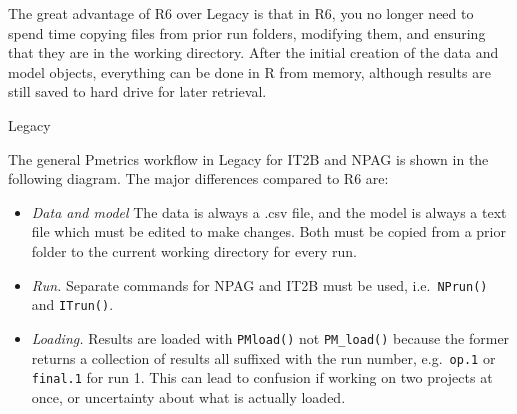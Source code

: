 \documentclass[
]{book}
\newenvironment{Shaded}{\begin{snugshade}}{\end{snugshade}}
\newcommand{\AttributeTok}[1]{\textcolor[rgb]{0.77,0.63,0.00}{#1}}
\newcommand{\CommentTok}[1]{\textcolor[rgb]{0.56,0.35,0.01}{\textit{#1}}}
\newcommand{\DecValTok}[1]{\textcolor[rgb]{0.00,0.00,0.81}{#1}}
\newcommand{\FloatTok}[1]{\textcolor[rgb]{0.00,0.00,0.81}{#1}}
\newcommand{\FunctionTok}[1]{\textcolor[rgb]{0.00,0.00,0.00}{#1}}
\newcommand{\NormalTok}[1]{#1}
\newcommand{\OtherTok}[1]{\textcolor[rgb]{0.56,0.35,0.01}{#1}}
\newcommand{\SpecialCharTok}[1]{\textcolor[rgb]{0.00,0.00,0.00}{#1}}
\newcommand{\StringTok}[1]{\textcolor[rgb]{0.31,0.60,0.02}{#1}}
\providecommand{\tightlist}{%
  \setlength{\itemsep}{0pt}\setlength{\parskip}{0pt}}
\begin{document}
\begin{Shaded}
\end{Shaded}

The great advantage of R6 over Legacy is that in R6, you no longer need to spend time copying files from prior run folders, modifying them, and ensuring that they are in the working directory. After the initial creation of the data and model objects, everything can be done in R from memory, although results are still saved to hard drive for later retrieval.

{Legacy}

The general Pmetrics workflow in Legacy for IT2B and NPAG is shown in the
following diagram. The major differences compared to R6 are:

\begin{itemize}
\tightlist
\item
  \emph{Data and model} The data is always a .csv file, and the model is always a text file which must be edited to make changes. Both must be copied from a prior folder to the current working directory for every run.
\item
  \emph{Run.} Separate commands for NPAG and IT2B must be used, i.e.~\texttt{NPrun()} and \texttt{ITrun()}.
\item
  \emph{Loading.} Results are loaded with \texttt{PMload()} not \texttt{PM\_load()} because the former returns a collection of results all suffixed with the run number, e.g.~\texttt{op.1} or \texttt{final.1} for run 1. This can lead to confusion if working on two projects at once, or uncertainty about what is actually loaded.
\end{itemize}
\end{document}

